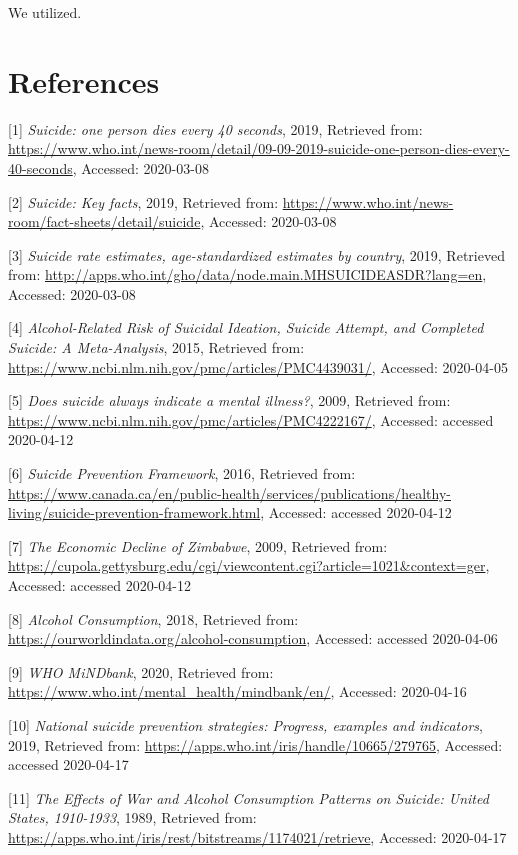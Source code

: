 \documentclass[]{article}
\begin{document}
We utilized.

\newpage 

\section{References}\label{references}

{[}1{]} \emph{Suicide: one person dies every 40 seconds}, 2019,
Retrieved from:
\url{https://www.who.int/news-room/detail/09-09-2019-suicide-one-person-dies-every-40-seconds},
Accessed: 2020-03-08

{[}2{]} \emph{Suicide: Key facts}, 2019, Retrieved from:
\url{https://www.who.int/news-room/fact-sheets/detail/suicide},
Accessed: 2020-03-08

{[}3{]} \emph{Suicide rate estimates, age-standardized estimates by
country}, 2019, Retrieved from:
\url{http://apps.who.int/gho/data/node.main.MHSUICIDEASDR?lang=en},
Accessed: 2020-03-08

{[}4{]} \emph{Alcohol-Related Risk of Suicidal Ideation, Suicide
Attempt, and Completed Suicide: A Meta-Analysis}, 2015, Retrieved from:
\url{https://www.ncbi.nlm.nih.gov/pmc/articles/PMC4439031/}, Accessed:
2020-04-05

{[}5{]} \emph{Does suicide always indicate a mental illness?}, 2009,
Retrieved from:
\url{https://www.ncbi.nlm.nih.gov/pmc/articles/PMC4222167/}, Accessed:
accessed 2020-04-12

{[}6{]} \emph{Suicide Prevention Framework}, 2016, Retrieved from:
\url{https://www.canada.ca/en/public-health/services/publications/healthy-living/suicide-prevention-framework.html},
Accessed: accessed 2020-04-12

{[}7{]} \emph{The Economic Decline of Zimbabwe}, 2009, Retrieved from:
\url{https://cupola.gettysburg.edu/cgi/viewcontent.cgi?article=1021\&context=ger},
Accessed: accessed 2020-04-12

{[}8{]} \emph{Alcohol Consumption}, 2018, Retrieved from:
\url{https://ourworldindata.org/alcohol-consumption}, Accessed: accessed
2020-04-06

{[}9{]} \emph{WHO MiNDbank}, 2020, Retrieved from:
\url{https://www.who.int/mental_health/mindbank/en/}, Accessed:
2020-04-16

{[}10{]} \emph{National suicide prevention strategies: Progress,
examples and indicators}, 2019, Retrieved from:
\url{https://apps.who.int/iris/handle/10665/279765}, Accessed: accessed
2020-04-17

{[}11{]} \emph{The Effects of War and Alcohol Consumption Patterns on
Suicide: United States, 1910-1933}, 1989, Retrieved from:
\url{https://apps.who.int/iris/rest/bitstreams/1174021/retrieve},
Accessed: 2020-04-17
\end{document}
